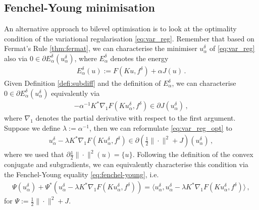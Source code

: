 \subsection{Fenchel-Young minimisation}
An alternative approach to bilevel optimisation is to look at the optimality condition of the variational regularisation \eqref{eq:var_reg}. Remember that based on Fermat's Rule \ref{thm:fermat}, we can characterise the minimiser $u_\alpha^\delta$ of \eqref{eq:var_reg} also via $0 \in \partial E_\alpha^\delta(u_\alpha^\delta)$, where $E_\alpha^\delta$ denotes the energy
\begin{align*}
    E_\alpha^\delta(u) := F(K u, f^\delta) + \alpha J(u) \, .
\end{align*}
Given Definition \ref{defi:subdiff} and the definition of $E_\alpha^\delta$, we can characterise $0 \in \partial E_\alpha^\delta(u_\alpha^\delta)$ equivalently via
\begin{align}
    -\alpha^{-1} K^* \nabla_1 F(K u_\alpha^\delta, f^\delta) \in \partial J(u_\alpha^\delta) \, ,\label{eq:var_reg_opt}
\end{align}
where $\nabla_1$ denotes the partial derivative with respect to the first argument. Suppose we define $\lambda := \alpha^{-1}$, then we can reformulate \eqref{eq:var_reg_opt} to
\begin{align*}
    u_\alpha^\delta - \lambda K^* \nabla_1 F(K u_\alpha^\delta, f^\delta) \in \partial \left( \frac12 \| \cdot \|^2 + J\right)(u_\alpha^\delta) \, ,
\end{align*}
where we used that $\partial \frac12 \| \cdot \|^2(u) = \{ u \}$. Following the definition of the convex conjugate and subgradients, we can equivalently characterise this condition via the Fenchel-Young equality \eqref{eq:fenchel-young}, i.e.
\begin{align*}
    \Psi(u_\alpha^\delta) + \Psi^*(u_\alpha^\delta - \lambda K^* \nabla_1 F(K u_\alpha^\delta, f^\delta)) = \langle u_\alpha^\delta, u_\alpha^\delta - \lambda K^* \nabla_1 F(K u_\alpha^\delta, f^\delta) \rangle \, ,
\end{align*}
for $\Psi := \frac12 \| \cdot \|^2 + J$.

